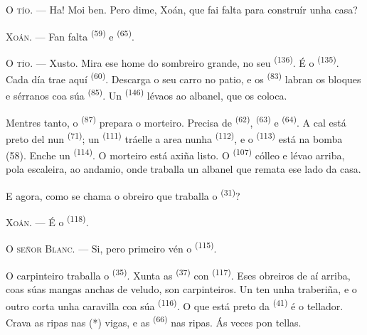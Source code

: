 \VUsaut{3.0mm}
\VUsaut{3.0mm}

\textsc{O tío}. --- Ha! Moi ben. Pero dime, Xoán, que fai falta para construír unha casa?

\textsc{Xoán}. --- Fan falta  \textsuperscript{(59)} e
 \textsuperscript{(65)}.

\textsc{O tío}. --- Xusto. Mira ese home do sombreiro grande, no seu 
\textsuperscript{(136)}. É o  \textsuperscript{(135)}. Cada día trae aquí
 \textsuperscript{(60)}. Descarga o seu carro no patio, e os
 \textsuperscript{(83)} labran os bloques e sérranos coa súa
 \textsuperscript{(85)}. Un  \textsuperscript{(146)}
lévaos ao albanel, que os coloca.

Mentres tanto, o  \textsuperscript{(87)} prepara o morteiro. Precisa de
 \textsuperscript{(62)},  \textsuperscript{(63)} e
 \textsuperscript{(64)}. A cal está preto del nun 
\textsuperscript{(71)}; un  \textsuperscript{(111)} tráelle a area
nunha  \textsuperscript{(112)}, e o
 \textsuperscript{(113)} está na bomba (58). Enche un 
\textsuperscript{(114)}. O morteiro está axiña listo. O 
\textsuperscript{(107)} cólleo e lévao arriba, pola escaleira, ao andamio, onde traballa un
albanel que remata ese lado da casa.

E agora, como se chama o obreiro que traballa o  \textsuperscript{(31)}?

\textsc{Xoán}. --- É o  \textsuperscript{(118)}.

\VUsaut{3.0mm}
\VUsaut{3.0mm}

\textsc{O señor Blanc}. --- Si, pero primeiro vén o 
\textsuperscript{(115)}.

O carpinteiro traballa o  \textsuperscript{(35)}. Xunta as
 \textsuperscript{(37)} con 
\textsuperscript{(117)}. Eses obreiros de aí arriba, coas súas mangas anchas de veludo, son
carpinteiros. Un ten unha traberiña, e o outro corta unha caravilla coa súa
 \textsuperscript{(116)}. O que está preto da 
\textsuperscript{(41)} é o tellador. Crava as ripas nas (*) vigas, e as
 \textsuperscript{(66)} nas ripas. Ás veces pon tellas.

